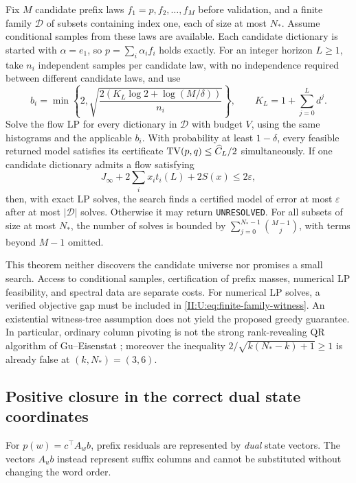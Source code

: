 \begin{theorem}
\label{II:U:thm:finite-family-search}
Fix $M$ candidate prefix laws $f_1=p,f_2,\ldots,f_M$ before validation,
and a finite family $\mathcal D$ of subsets containing index one, each
of size at most $N_*$. Assume conditional samples from these laws are
available. Each candidate dictionary is started with $\alpha=e_1$, so $p=\sum_i\alpha_i f_i$ holds exactly. For an integer horizon $L\ge1$, take $n_i$ independent samples per candidate
law, with no independence required between different candidate laws,
and use
\[
 b_i=\min\left\{2,\sqrt{
    \frac{2(K_L\log2+\log(M/\delta))}{n_i}}\right\},\qquad
 K_L=1+\sum_{j=0}^Ld^j.
\]
Solve the flow LP for every dictionary in $\mathcal D$ with budget $V$,
using the same histograms and the applicable $b_i$. With probability
at least $1-\delta$, every feasible returned model satisfies its
certificate $\operatorname{TV}(p,q)\le\widehat C_L/2$ simultaneously.
If one candidate dictionary admits a flow satisfying
\begin{equation}
 J_\infty+2\sum_i x_it_i(L)+2S(x)\le2\varepsilon,
 \label{II:U:eq:finite-family-witness}
\end{equation}
then, with exact LP solves, the search finds a certified model of error
at most $\varepsilon$ after at most $|\mathcal D|$ solves.
Otherwise it may return \texttt{UNRESOLVED}. For all subsets of size
at most $N_*$, the number of solves is bounded by
$\sum_{j=0}^{N_*-1}\binom{M-1}{j}$, with terms beyond $M-1$ omitted.
\end{theorem}


This theorem neither discovers the candidate universe nor promises a
small search. Access to conditional samples, certification of prefix
masses, numerical LP feasibility, and spectral data are separate costs.
For numerical LP solves, a verified objective gap must be included in
\eqref{II:U:eq:finite-family-witness}. An existential witness-tree assumption
does not yield the proposed greedy guarantee. In particular, ordinary
column pivoting is not the strong rank-revealing QR algorithm of
Gu--Eisenstat \citep{gu1996}; moreover the inequality
$2/\sqrt{k(N_*-k)+1}\ge1$ is already false at $(k,N_*)=(3,6)$.

\subsection{Positive closure in the correct dual state coordinates}
\label{II:U:sec:dual-positive-closure}
For $p(w)=c^\top A_wb$, prefix residuals are represented by
\emph{dual} state vectors. The vectors $A_ub$ instead represent suffix
columns and cannot be substituted without changing the word order.

